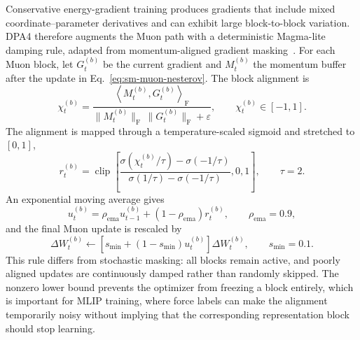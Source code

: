 Conservative energy-gradient training produces gradients that include mixed coordinate--parameter derivatives and can exhibit large block-to-block variation.
DPA4 therefore augments the Muon path with a deterministic Magma-lite damping rule, adapted from momentum-aligned gradient masking~\cite{joo2026magma}.
For each Muon block, let $G_t^{(b)}$ be the current gradient and $M_t^{(b)}$ the momentum buffer after the update in Eq.~\eqref{eq:sm-muon-nesterov}.
The block alignment is
\begin{equation}
    \chi_t^{(b)}
    =
    \frac{
        \left\langle M_t^{(b)},G_t^{(b)}\right\rangle_{\mathrm{F}}
    }{
        \|M_t^{(b)}\|_{\mathrm{F}}\,
        \|G_t^{(b)}\|_{\mathrm{F}}+\varepsilon
    },
    \qquad
    \chi_t^{(b)}\in[-1,1].
    \label{eq:sm-magma-cosine}
\end{equation}
The alignment is mapped through a temperature-scaled sigmoid and stretched to
$[0,1]$,
\begin{equation}
    r_t^{(b)}
    =
    \operatorname{clip}
    \left[
        \frac{
            \sigma(\chi_t^{(b)}/\tau)-\sigma(-1/\tau)
        }{
            \sigma(1/\tau)-\sigma(-1/\tau)
        },
        0,1
        \right],
    \qquad \tau=2.
    \label{eq:sm-magma-score}
\end{equation}
An exponential moving average gives
\begin{equation}
    u_t^{(b)}
    =
    \rho_{\mathrm{ema}} u_{t-1}^{(b)}
    +(1-\rho_{\mathrm{ema}})r_t^{(b)},
    \qquad \rho_{\mathrm{ema}}=0.9,
    \label{eq:sm-magma-ema}
\end{equation}
and the final Muon update is rescaled by
\begin{equation}
    \Delta W_t^{(b)}
    \leftarrow
    \left[s_{\min}+(1-s_{\min})u_t^{(b)}\right]\Delta W_t^{(b)},
    \qquad s_{\min}=0.1.
    \label{eq:sm-magma-lite}
\end{equation}
This rule differs from stochastic masking: all blocks remain active, and poorly aligned updates are continuously damped rather than randomly skipped.
The nonzero lower bound prevents the optimizer from freezing a block entirely, which is important for MLIP training, where force labels can make the alignment temporarily noisy without implying that the corresponding representation block should stop learning.
